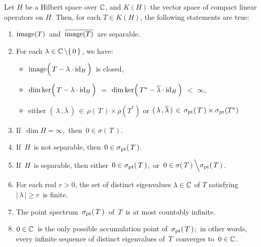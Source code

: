 \vskip 0.5cm
\begin{theorem}\mbox{}
\vskip 0.1cm
\noindent
Let $H$ be a Hilbert space over $\mathbb{C}$, and $K(H)$ the vector space of compact linear operators on $H$.
Then, for each $T \in K(H)$, the following statements are true:
\begin{enumerate}
\item
	$\textnormal{image}(T)$\, and \,$\overline{\textnormal{image}(T)}$\, are separable.
\item
	For each $\lambda \in \mathbb{C} \left\backslash\{\,0\,\}\right.$, we have:
	\begin{itemize}
	\item
		$\image\!\left(\,T \overset{{\color{white}.}}{-} \lambda\cdot\textnormal{id}_{H}\,\right)$\, is closed,
	\item
		$\dim\ker\!\left(\,T \overset{{\color{white}.}}{-} \lambda\cdot\textnormal{id}_{H}\,\right)$
		$=$
		$\dim\ker\!\left(\,T^{*} \overset{{\color{white}.}}{-} \overline{\lambda}\cdot\textnormal{id}_{H}\,\right)$
		$<$ $\infty$,
	\item
		either\;\;
		$(\,\lambda\,, \overline{\lambda}\,) \,\in\, \rho(\,T\,) \times \rho(T^{*})$
		\;\; or \;\;
		$(\,\lambda\,, \overline{\lambda}\,) \,\in\, \sigma_{\textnormal{pt}}(\,T\,) \times \sigma_{\textnormal{pt}}(T^{*})$
	\end{itemize}
\item
	If \,$\dim H = \infty$,\, then \,$0 \in \sigma(\,T\,)$.
\item
	If \,$H$\, is not separable, then \,$0 \in \sigma_{\textnormal{pt}}(\,T\,)$.
\item
	If \,$H$\, is separable, then either \,$0 \in \sigma_{\textnormal{pt}}(\,T\,)$,\, or
	\,$0 \in \sigma(\,T\,) \left\backslash \sigma_{\textnormal{pt}}(\,\overset{{\color{white}.}}{T}\,)\right.$.
\item
	For each real $r > 0$, the set of distinct eigenvalues $\lambda \in \mathbb{C}$ of $T$
	satisfying \,$\vert\,\lambda\,\vert \geq r$\, is finite.
\item
	The point spectrum \,$\sigma_{\textnormal{pt}}(\,T\,)$\, of $\,T$\, is at most countably infinite.
\item
	$0 \in \mathbb{C}$\, is the only possible accumulation point of \,$\sigma_{\textnormal{pt}}(\,T\,)$;\,
	in other words, every infinite sequence of distinct eigenvalues of \,$T$\, converges to \,$0 \in \mathbb{C}$.
\end{enumerate}
\end{theorem}

